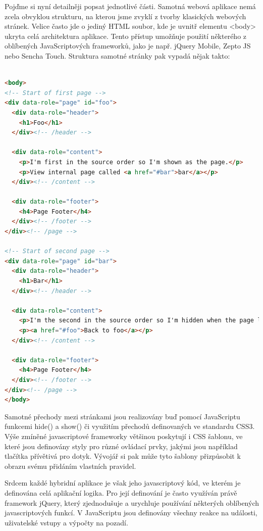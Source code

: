 Pojďme si nyní detailněji popsat jednotlivé části. Samotná webová aplikace nemá zcela obvyklou strukturu, na kterou jsme zvyklí z tvorby klasických webových stránek. Velice často jde o jediný HTML soubor, kde je uvnitř elementu <body> ukryta celá architektura aplikace. Tento přístup umožňuje použití některého z oblíbených JavaScriptových frameworků, jako je např. jQuery Mobile, Zepto JS nebo Sencha Touch. Struktura samotné stránky pak vypadá nějak takto:


\begin{lstlisting}[language=HTML,breaklines=true]

<body>
<!-- Start of first page -->
<div data-role="page" id="foo">
  <div data-role="header">
    <h1>Foo</h1>
  </div><!-- /header -->

  <div data-role="content">
    <p>I'm first in the source order so I'm shown as the page.</p>
    <p>View internal page called <a href="#bar">bar</a></p>
  </div><!-- /content -->

  <div data-role="footer">
    <h4>Page Footer</h4>
  </div><!-- /footer -->
</div><!-- /page -->

<!-- Start of second page -->
<div data-role="page" id="bar">
  <div data-role="header">
    <h1>Bar</h1>
  </div><!-- /header -->

  <div data-role="content">
    <p>I'm the second in the source order so I'm hidden when the page loads.I'm just shown if a link that references my id is beeing clicked.</p>
    <p><a href="#foo">Back to foo</a></p>
  </div><!-- /content -->

  <div data-role="footer">
    <h4>Page Footer</h4>
  </div><!-- /footer -->
</div><!-- /page -->
</body>
\end{lstlisting}

Samotné přechody mezi stránkami jsou realizovány buď pomocí JavaScriptu funkcemi hide() a show() či využitím přechodů definovaných ve standardu CSS3. Výše zmíněné javascriptové frameworky většinou poskytují i CSS šablonu, ve které jsou definovány styly pro různé ovládací prvky, jakými jsou například tlačítka přívětivá pro dotyk. Vývojář si pak může tyto šablony přizpůsobit k obrazu svému přidáním vlastních pravidel.

Srdcem každé hybridní aplikace je však jeho javascriptový kód, ve kterém je definována celá aplikační logika. Pro její definování je často využíván právě framework jQuery, který zjednodušuje a urychluje používání některých oblíbených javascriptových funkcí. V JavaScriptu jsou definovány všechny reakce na události, uživatelské vstupy a výpočty na pozadí.

